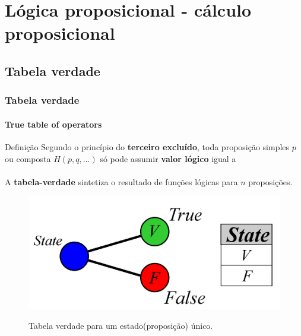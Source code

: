 \documentclass[10pt, headsepline, captions=tableabove, xcolor=table]{beamer}
\begin{document}
\section{Lógica proposicional - cálculo proposicional}
%
\subsection{Tabela verdade}
%
\begin{frame}[t]
    \frametitle{Tabela verdade}
    \framesubtitle{True table of operators}
    \begin{alertblock}{Definição}
        \small
        Segundo o princípio do \textbf{terceiro excluído}, toda proposição simples $p$ ou composta $H(p,q,...)$ só pode assumir \textbf{valor lógico} igual a \\ [1pt]
         \\ [4pt]
        A \textbf{tabela-verdade} sintetiza o resultado de funções lógicas para $n$ proposições.
    \end{alertblock}
    \vspace{-4mm}
    \begin{figure}[c]
        \centering
        \caption{Tabela verdade para um estado(proposição) único.}
        \includegraphics[scale=0.25]{TT2.png}
        \label{fig:tabela-verdade1}         
    \end{figure}
\end{frame}
%
\end{document}
